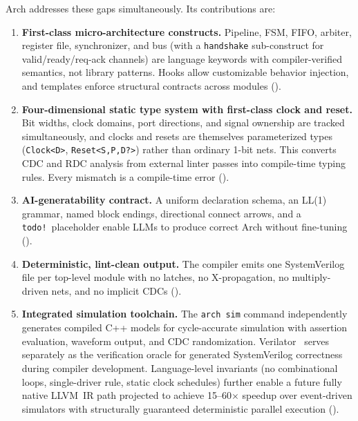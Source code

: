 \documentclass[11pt,twocolumn]{article}
\begin{document}
Arch addresses these gaps simultaneously. Its contributions are:

\begin{enumerate}
\item \textbf{First-class micro-architecture constructs.} Pipeline, FSM, FIFO, arbiter, register file, synchronizer, and bus (with a \texttt{handshake} sub-construct for valid/ready/req-ack channels) are language keywords with compiler-verified semantics, not library patterns. Hooks allow customizable behavior injection, and templates enforce structural contracts across modules ().

\item \textbf{Four-dimensional static type system with first-class clock and reset.} Bit widths, clock domains, port directions, and signal ownership are tracked simultaneously, and clocks and resets are themselves parameterized types (\texttt{Clock<D>}, \texttt{Reset<S,P,D?>}) rather than ordinary 1-bit nets. This converts CDC and RDC analysis from external linter passes into compile-time typing rules. Every mismatch is a compile-time error ().

\item \textbf{AI-generatability contract.} A uniform declaration schema, an LL(1) grammar, named block endings, directional connect arrows, and a \texttt{todo!}\ placeholder enable LLMs to produce correct Arch without fine-tuning ().

\item \textbf{Deterministic, lint-clean output.} The compiler emits one SystemVerilog file per top-level module with no latches, no X-propagation, no multiply-driven nets, and no implicit CDCs ().

\item \textbf{Integrated simulation toolchain.} The \texttt{arch sim} command independently generates compiled C++ models for cycle-accurate simulation with assertion evaluation, waveform output, and CDC randomization. Verilator~\cite{verilator} serves separately as the verification oracle for generated SystemVerilog correctness during compiler development. Language-level invariants (no combinational loops, single-driver rule, static clock schedules) further enable a future fully native LLVM~IR path projected to achieve 15--60$\times$ speedup over event-driven simulators with structurally guaranteed deterministic parallel execution ().
\end{enumerate}
\end{document}
